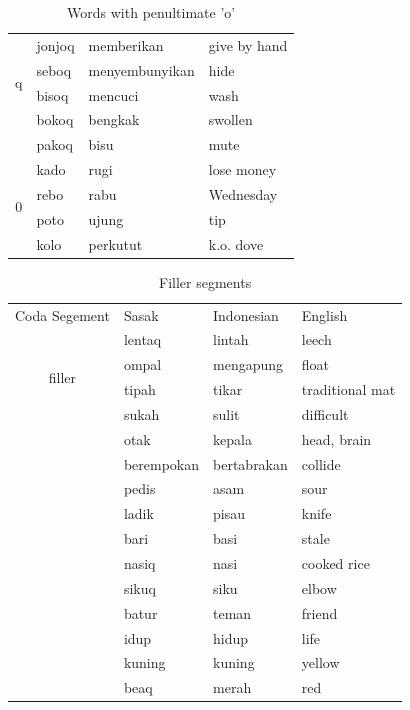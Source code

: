 \documentclass[12pt]{ouparticle}
\begin{document}
\begin{table}[]
\begin{tabular}{c|l l l}
    \hline
    \multirow{4}{*}{q} & jonjoq & memberikan & give by hand\\
                       & seboq & menyembunyikan & hide\\
                       & bisoq & mencuci & wash\\
                       & bokoq & bengkak   & swollen \\
                       & pakoq & bisu & mute \\
    \hline
    \multirow{4}{*}{0} & kado & rugi & lose money\\
                       & rebo & rabu & Wednesday\\
                       & poto & ujung & tip\\
                       & kolo & perkutut & k.o. dove\\

    \end{tabular}
    \caption{Words with penultimate 'o'}
    \label{tab:my_label}
\end{table}

\begin{table}[]
    \centering
    \begin{tabular}{c|l l l}
    Coda Segement & Sasak & Indonesian & English  \\
    \multirow{4}{*}{filler} 
                       & lentaq & lintah & leech\\
                       & ompal & mengapung & float\\
                       & tipah & tikar & traditional mat\\
                       & sukah & sulit   & difficult \\
                       & otak & kepala & head, brain\\
                       & berempokan & bertabrakan & collide\\
                       & pedis & asam & sour\\
                       & ladik & pisau & knife\\
                       & bari & basi & stale\\
                       & nasiq & nasi & cooked rice\\
                       & sikuq & siku & elbow\\
                       & batur & teman & friend\\
                       & idup & hidup & life\\
                       & kuning & kuning & yellow\\
                       & beaq   & merah & red\\
    \end{tabular}
    \caption{Filler segments}
    \label{tab:my_label}
\end{table}
\end{document}
